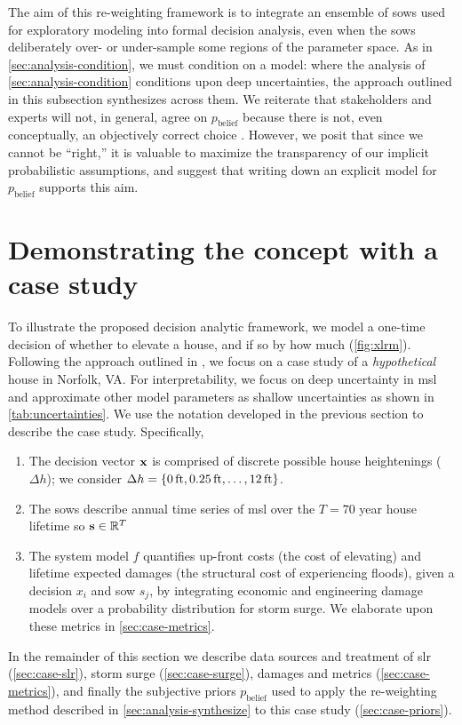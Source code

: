 \documentclass{agujournal2019}
\begin{document}
The aim of this re-weighting framework is to integrate an ensemble of \glspl{sow} used for exploratory modeling into formal decision analysis, even when the \glspl{sow} deliberately over- or under-sample some regions of the parameter space.
As in \cref{sec:analysis-condition}, we must condition on a model: where the analysis of \cref{sec:analysis-condition} conditions upon deep uncertainties, the approach outlined in this subsection synthesizes across them.
We reiterate that stakeholders and experts will not, in general, agree on $p_\mathrm{belief}$ because there is not, even conceptually, an objectively correct choice \cite{oreskes_verification:1994,walker_deep:2013}.
However, we posit that since we cannot be ``right,'' it is valuable to maximize the transparency of our implicit probabilistic assumptions, and suggest that writing down an explicit model for $p_\mathrm{belief}$ supports this aim.

\section{Demonstrating the concept with a case study}\label{sec:case-study}

To illustrate the proposed decision analytic framework, we model a one-time decision of whether to elevate a house, and if so by how much (\cref{fig:xlrm}).
Following the approach outlined in , we focus on a case study of a \emph{hypothetical} house in Norfolk, VA.
For interpretability, we focus on deep uncertainty in \gls{msl} and approximate other model parameters as shallow uncertainties as shown in \cref{tab:uncertainties}.
We use the notation developed in the previous section to describe the case study.
Specifically,
\begin{enumerate}
  \item The decision vector $\vb{x}$ is comprised of discrete possible house heightenings ($\Delta h$); we consider $\Delta h = \qty{\SI{0}{ft}, \SI{0.25}{ft}, \ldots, \SI{12}{ft}}$.
  \item The \glspl{sow} describe annual time series of \gls{msl} over the $T=70$ year house lifetime so $\vb{s} \in \mathbb{R}^T$
  \item The system model $f$ quantifies up-front costs (the cost of elevating) and lifetime expected damages (the structural cost of experiencing floods), given a decision $x_i$ and \gls{sow} $s_j$, by integrating economic and engineering damage models over a probability distribution for storm surge. We elaborate upon these metrics in \cref{sec:case-metrics}.
\end{enumerate}
In the remainder of this section we describe data sources and treatment of \gls{slr} (\cref{sec:case-slr}), storm surge (\cref{sec:case-surge}), damages and metrics (\cref{sec:case-metrics}), and finally the subjective priors $p_\mathrm{belief}$ used to apply the re-weighting method described in \cref{sec:analysis-synthesize} to this case study (\cref{sec:case-priors}).
\end{document}
